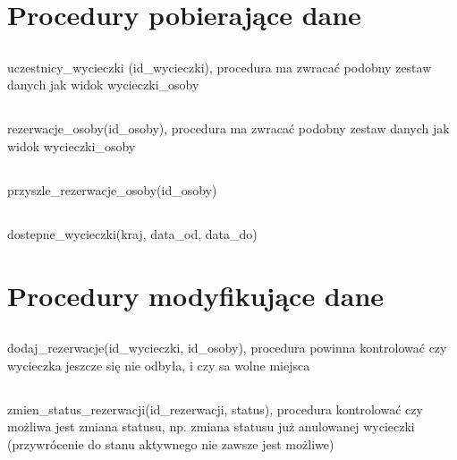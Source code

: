 \documentclass[12pt]{article}
\begin{document}
\section{Procedury pobierające dane}

\subsection{}
uczestnicy\_wycieczki (id\_wycieczki), procedura ma zwracać podobny zestaw danych jak widok wycieczki\_osoby


\subsection{}
rezerwacje\_osoby(id\_osoby), procedura ma zwracać podobny zestaw danych jak widok wycieczki\_osoby


\subsection{}
przyszle\_rezerwacje\_osoby(id\_osoby)


\subsection{}
dostepne\_wycieczki(kraj, data\_od, data\_do)


\section{Procedury modyfikujące dane}
\subsection{}
dodaj\_rezerwacje(id\_wycieczki, id\_osoby), procedura powinna kontrolować czy wycieczka
jeszcze się nie odbyła, i czy sa wolne miejsca

\subsection{}
zmien\_status\_rezerwacji(id\_rezerwacji, status), procedura kontrolować czy możliwa jest
zmiana statusu, np. zmiana statusu już anulowanej wycieczki (przywrócenie do stanu
aktywnego nie zawsze jest możliwe)

\end{document}
